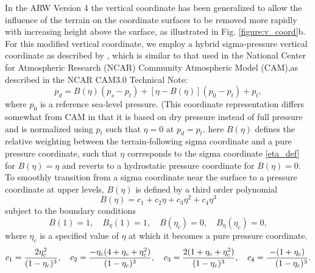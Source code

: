 In the ARW Version 4 the vertical coordinate has been generalized to allow the
influence of the terrain on the coordinate surfaces to be removed more rapidly
with increasing height above the surface, as illustrated in Fig. \ref{figure:v_coord}b. For this modified  vertical coordinate, we employ a hybrid sigma-pressure vertical coordinate as described by \citet{park13}, which is similar to that used in the National Center for Atmospheric Research (NCAR) Community Atmospheric Model (CAM),as described in the NCAR CAM3.0 Technical Note:
%
\begin{equation}
p_d = B(\eta)(p_{s}-p_t) + [\eta-B(\eta)](p_0-{p_t})+p_t,          
\label{hyb_def}
 \end{equation}
%
where $p_0$ is a reference sea-level pressure. (This coordinate representation differs somewhat from CAM in that it is based on dry pressure instead of full pressure and is normalized using $p_t$ such that $\eta=0$ at $p_d = p_t$. here $B(\eta)$ defines the relative weighting between the terrain-following sigma coordinate and a pure pressure coordinate, such that $\eta$ corresponds to the sigma coordinate \eqref{eta_def} for $B(\eta) = \eta$ and reverts to a hydrostatic pressure coordinate for $B(\eta) = 0$. To smoothly transition from a sigma coordinate near the surface to a pressure coordinate at upper levels, $B(\eta)$ is defined by a third order polynomial
%
\begin{equation}
B(\eta) = c_1+c_2\eta+c_3\eta^2+c_4\eta^3         
\label{B_def}
 \end{equation}
%
subject to the boundary conditions
%
\begin{equation}
B(1)=1,\quad B_\eta(1)=1, \quad B(\eta_c)=0, \quad B_\eta(\eta_c)=0,         
\label{B_bc}
 \end{equation}
%
where $\eta_c$ is a specified value of $\eta$ at which it becomes a pure pressure coordinate.
%
\begin{equation}
c_1={2\eta_c^2\over(1-\eta_c)^3},  \quad      
c_2={-\eta_c(4+\eta_c+\eta_c^2)\over(1-\eta_c)^3},  \quad      
c_3={2(1+\eta_c+\eta_c^2)\over(1-\eta_c)^3},  \quad      
c_4={-(1+\eta_c)\over\ \ \ (1-\eta_c)^3}.    
\label{B_cof}
 \end{equation}
%
%
